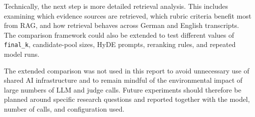 Technically, the next step is more detailed retrieval analysis. This includes
examining which evidence sources are retrieved, which rubric criteria benefit
most from RAG, and how retrieval behaves across German and English transcripts.
The comparison framework could also be extended to test different values of
\texttt{final\_k}, candidate-pool sizes, HyDE prompts, reranking rules, and
repeated model runs.

The extended comparison was not used in this report to avoid unnecessary use of
shared AI infrastructure and to remain mindful of the environmental impact of
large numbers of LLM and judge calls. Future experiments should therefore be
planned around specific research questions and reported together with the model,
number of calls, and configuration used.
